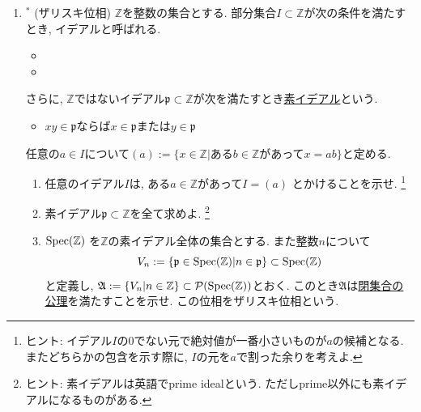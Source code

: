 \documentclass[dvipdfmx,a4paper,11pt]{article}
\newcommand{\Z}{\mathbb{Z}}
\theoremstyle{definition}
\begin{document}
\begin{enumerate}[label=\textbf{問}\ref*{sec-open}.\arabic*]
\item $^{*}$ \label{Zariski_topology} (ザリスキ位相)
$\Z$を整数の集合とする.
部分集合$I \subset \Z$が次の条件を満たすとき, イデアルと呼ばれる.
\begin{itemize}
	\setlength{\parskip}{0cm}
	\setlength{\itemsep}{0pt} 
\item {}
\item \text{$x\in I$, $a \in \Z$ならば$a x \in I$}
\end{itemize}
さらに, $\Z$ではないイデアル$\mathfrak{p} \subset \Z$が次を満たすとき\underline{素イデアル}という.
\begin{itemize}
	\setlength{\parskip}{0cm}
	\setlength{\itemsep}{0pt} 
\item $x y \in \mathfrak{p}$ならば$x \in \mathfrak{p}$または$y \in \mathfrak{p}$
\end{itemize}
任意の$a \in I$について$(a) :=  \{ x \in \Z | \text{ある$b \in \Z$があって$x =ab$}\}$と定める.
\begin{enumerate}
\setlength{\parskip}{0cm}
\setlength{\itemsep}{0pt} 
\item 任意のイデアル$I$は, ある$a \in \Z$があって$I = (a)$
とかけることを示せ. 
\footnote{ヒント: イデアル$I$の0でない元で絶対値が一番小さいものが$a$の候補となる. またどちらかの包含を示す際に, $I$の元を$a$で割った余りを考えよ. }
\item 素イデアル$\mathfrak{p}  \subset \Z$を全て求めよ. \footnote{ヒント: 素イデアルは英語でprime idealという. ただしprime以外にも素イデアルになるものがある.}
\item ${\rm Spec}(\Z)$ を$\Z$の素イデアル全体の集合とする. また整数$n$について
$$
V_{n} := \{ \mathfrak{p} \in {\rm Spec}(\Z) | n\in \mathfrak{p}\} \subset {\rm Spec}(\Z) 
$$
と定義し, $\mathfrak{A} := \{V_{n} | n \in \Z \} \subset \mathcal{P}({\rm Spec}(\Z) ) $とおく.
このとき$\mathfrak{A}$は\underline{閉集合の公理}を満たすことを示せ. この位相をザリスキ位相という. 
\end{enumerate}





\end{enumerate}
\end{document}

